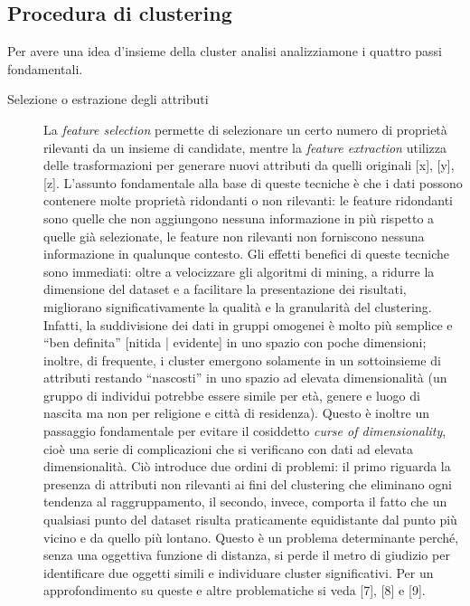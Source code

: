 \subsection{Procedura di clustering}
Per avere una idea d'insieme della cluster analisi analizziamone i quattro passi fondamentali.

\begin{description}

\item[Selezione o estrazione degli attributi] La \textit{feature selection} permette di selezionare un certo numero di propriet\`a rilevanti da un insieme di candidate, mentre la \textit{feature extraction} utilizza delle trasformazioni per generare nuovi attributi da quelli originali [x], [y], [z]. L'assunto fondamentale alla base di queste tecniche \`e che i dati possono contenere molte propriet\`a ridondanti o non rilevanti: le feature ridondanti sono quelle che non aggiungono nessuna informazione in pi\`u rispetto a quelle gi\`a selezionate, le feature non rilevanti non forniscono nessuna informazione in qualunque contesto. Gli effetti benefici di queste tecniche sono immediati: oltre a velocizzare gli algoritmi di mining, a ridurre la dimensione del dataset e a facilitare la presentazione dei risultati, migliorano significativamente la qualit\`a e la granularit\`a del clustering. Infatti, la suddivisione dei dati in gruppi omogenei \`e molto pi\`u semplice e ``ben definita'' [nitida | evidente] in uno spazio con poche dimensioni; inoltre, di frequente, i cluster emergono solamente in un sottoinsieme di attributi restando ``nascosti'' in uno spazio ad elevata dimensionalit\`a (un gruppo di individui potrebbe essere simile per et\`a, genere e luogo di nascita ma non per religione e citt\`a di residenza).
Questo \`e inoltre un passaggio fondamentale per evitare il cosiddetto \textit{curse of dimensionality}, cio\`e una serie di complicazioni che si verificano con dati ad elevata dimensionalit\`a. Ci\`o introduce due ordini di problemi: il primo riguarda la presenza di attributi non rilevanti ai fini del clustering che eliminano ogni tendenza al raggruppamento, il secondo, invece, comporta il fatto che un qualsiasi punto del dataset risulta praticamente equidistante dal punto pi\`u vicino e da quello pi\`u lontano. Questo \`e un problema determinante perch\'e, senza una oggettiva funzione di distanza, si perde il metro di giudizio per identificare due oggetti simili e individuare cluster significativi. Per un approfondimento su queste e altre problematiche si veda [7], [8] e [9].

\end{description}
